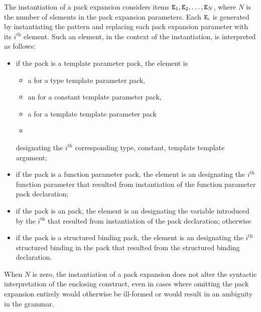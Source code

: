 \documentclass{wg21}
\begin{document}
\pnum
The instantiation of a pack expansion
considers
items $\texttt{E}_1, \texttt{E}_2, \dotsc, \texttt{E}_N$,
where
$N$ is the number of elements in the pack expansion parameters.
Each $\texttt{E}_i$ is generated by instantiating the pattern and
replacing each pack expansion parameter with its $i^\text{th}$ element.
Such an element, in the context of the instantiation, is interpreted as
follows:
\begin{itemize}
    \item
    if the pack is a template parameter pack, the element is
    \begin{itemize}
        \item
        a  for a type template parameter pack,
        \item
        an  for a constant template parameter pack, 
        \item
        a  for a template template parameter pack
        \item
    \end{itemize}
    designating the $i^\text{th}$ corresponding
    type, constant,  template template argument;
    \item
    if the pack is a function parameter pack, the element is an
    designating the $i^\text{th}$ function parameter
    that resulted from instantiation of
    the function parameter pack declaration;
    \item
    if the pack is an  pack,
    the element is an 
    designating the variable introduced by
    the $i^\text{th}$ 
    that resulted from instantiation of
    the  pack declaration;
    otherwise
    \item
    if the pack is a structured binding pack,
    the element is an 
    designating the $i^\textrm{th}$ structured binding in the pack
    that resulted from the structured binding declaration.
\end{itemize}
When $N$ is zero, the instantiation of a pack expansion
does not alter the syntactic interpretation of the enclosing construct,
even in cases where omitting the pack expansion entirely would
otherwise be ill-formed or would result in an ambiguity in the grammar.
\end{document}
